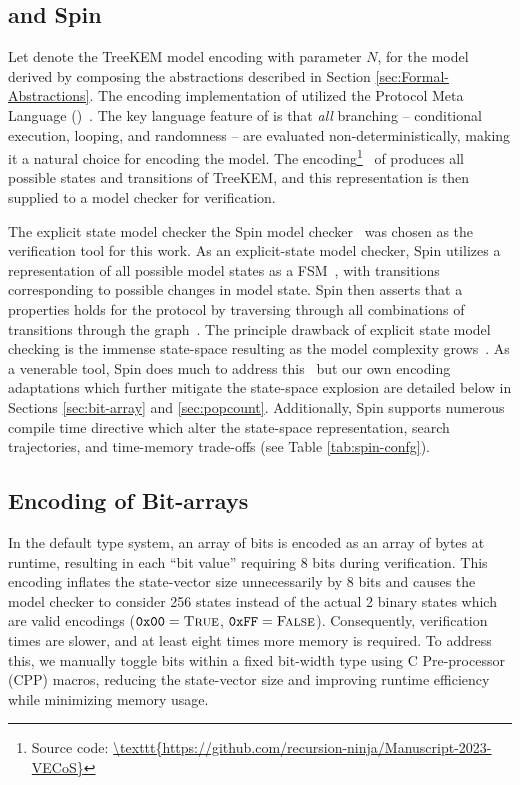 \documentclass[runningheads]{llncs}
\newcommand{\Abrev}[1]{\gls{#1}}
\begin{document}
\subsection{\Promela and Spin}

Let  denote the TreeKEM model encoding with parameter $N$, for the model derived by composing the abstractions described in Section \ref{sec:Formal-Abstractions}.
The encoding implementation of  utilized the Protocol Meta Language (\Promela)~\cite{HolzmannSpinBook2003}.
The key language feature of \Promela is that \emph{all} branching -- conditional execution, looping, and randomness -- are evaluated non-deterministically, making it a natural choice for encoding the model.
The \Promela encoding\footnote{Source code: \url{\texttt{https://github.com/recursion-ninja/Manuscript-2023-VECoS}}}\ %
of  produces all possible states and transitions of TreeKEM, and this representation is then supplied to a model checker for verification.

The explicit state model checker the Spin model checker~\cite{HolzmannSpinBook2003} was chosen as the verification tool for this work.
As an explicit-state model checker, Spin utilizes a representation of all possible model states as a \Abrev{FSM}~\cite{clarke1981design}, with transitions corresponding to possible changes in model state.
Spin then asserts that a properties holds for the protocol by traversing through all combinations of transitions through the graph~\cite{Vardi1986}.
The principle drawback of explicit state model checking is the immense state-space resulting as the model complexity grows~\cite{burch1992symbolic}.
As a venerable tool, Spin does much to address this~\cite{rudin1987limits} but our own encoding adaptations which further mitigate the state-space explosion are detailed below in Sections \ref{sec:bit-array} and \ref{sec:popcount}.
Additionally, Spin supports numerous compile time directive which alter the state-space representation, search trajectories, and time-memory trade-offs (see Table \ref{tab:spin-confg}).


\subsection{Encoding  of Bit-arrays\label{sec:bit-array}}

In the default \Promela type system, an array of bits is encoded as an array of bytes at runtime, resulting in each ``bit value'' requiring 8 bits during verification.
This encoding inflates the state-vector size unnecessarily by 8 bits and causes the model checker to consider 256 states instead of the actual 2 binary states which are valid encodings ($\texttt{0x00} = \textsc{True}$, $\texttt{0xFF} = \textsc{False}$).
Consequently, verification times are slower, and at least eight times more memory is required.
To address this, we manually toggle bits within a fixed bit-width \Promela type using C Pre-processor (CPP) macros, reducing the state-vector size and improving runtime efficiency while minimizing memory usage.
\end{document}
